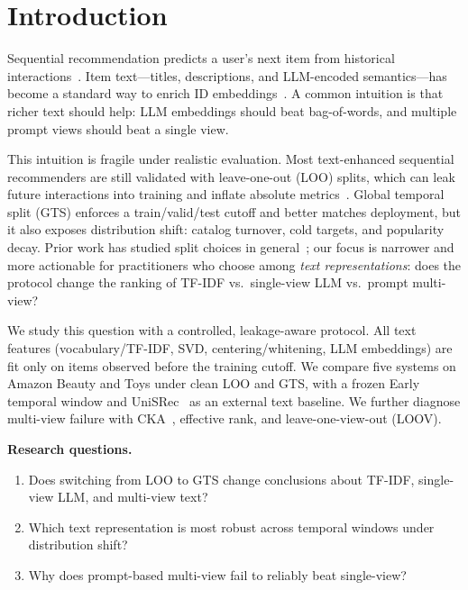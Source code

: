 \documentclass[sigconf,natbib=true,anonymous]{acmart}
\newcommand{\tfidf}{\textsc{TF-IDF}\xspace}
\newcommand{\llm}{\textsc{LLM}\xspace}
\begin{document}

\maketitle

\section{Introduction}

Sequential recommendation predicts a user's next item from historical interactions~\cite{kang2018sasrec,sun2019bert4rec,hidasi2016gru4rec}.
Item text---titles, descriptions, and LLM-encoded semantics---has become a standard way to enrich ID embeddings~\cite{hou2022unisrec,hou2023vqrec,bao2023tallrec}.
A common intuition is that richer text should help: \llm embeddings should beat bag-of-words, and multiple prompt views should beat a single view.

This intuition is fragile under realistic evaluation.
Most text-enhanced sequential recommenders are still validated with leave-one-out (LOO) splits, which can leak future interactions into training and inflate absolute metrics~\cite{ji2023evaluation,sun2023reevaluation}.
Global temporal split (GTS) enforces a train/valid/test cutoff and better matches deployment, but it also exposes distribution shift: catalog turnover, cold targets, and popularity decay.
Prior work has studied split choices in general~\cite{meng2020temporal,krichene2020sampledmetrics}; our focus is narrower and more actionable for practitioners who choose among \emph{text representations}:
does the protocol change the ranking of \tfidf vs.\ single-view \llm vs.\ prompt multi-view?

We study this question with a controlled, leakage-aware protocol.
All text features (vocabulary/\tfidf, SVD, centering/whitening, LLM embeddings) are fit only on items observed before the training cutoff.
We compare five systems on Amazon Beauty and Toys under clean LOO and GTS, with a frozen Early temporal window and UniSRec~\cite{hou2022unisrec} as an external text baseline.
We further diagnose multi-view failure with CKA~\cite{kornblith2019cka}, effective rank, and leave-one-view-out (LOOV).

\noindent\textbf{Research questions.}
\begin{enumerate}[leftmargin=*,itemsep=1pt]
\item[\textbf{RQ1}] Does switching from LOO to GTS change conclusions about \tfidf, single-view \llm, and multi-view text?
\item[\textbf{RQ2}] Which text representation is most robust across temporal windows under distribution shift?
\item[\textbf{RQ3}] Why does prompt-based multi-view fail to reliably beat single-view?
\end{enumerate}
\end{document}
